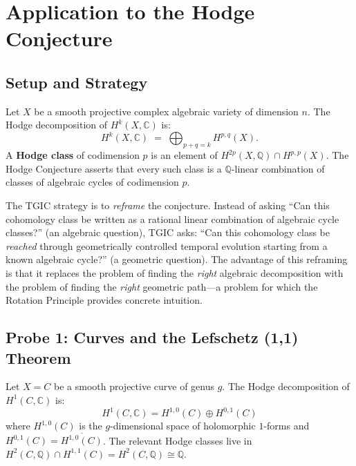 \documentclass[11pt,a4paper]{article}
\theoremstyle{definition}
\theoremstyle{plain}
\newcommand{\QQ}{\mathbb{Q}}
\newcommand{\CC}{\mathbb{C}}
\begin{document}
\section{Application to the Hodge Conjecture}\label{sec:application}

\subsection{Setup and Strategy}

Let $X$ be a smooth projective complex algebraic variety of dimension $n$. The Hodge decomposition of $H^{k}(X, \CC)$ is:
\begin{equation}\label{eq:hodge-decomp}
H^{k}(X, \CC) \;=\; \bigoplus_{p+q=k} H^{p,q}(X).
\end{equation}
A \textbf{Hodge class} of codimension $p$ is an element of $H^{2p}(X, \QQ) \cap H^{p,p}(X)$. The Hodge Conjecture asserts that every such class is a $\QQ$-linear combination of classes of algebraic cycles of codimension $p$.

The TGIC strategy is to \emph{reframe} the conjecture. Instead of asking ``Can this cohomology class be written as a rational linear combination of algebraic cycle classes?'' (an algebraic question), TGIC asks: ``Can this cohomology class be \emph{reached} through geometrically controlled temporal evolution starting from a known algebraic cycle?'' (a geometric question). The advantage of this reframing is that it replaces the problem of finding the \emph{right} algebraic decomposition with the problem of finding the \emph{right} geometric path---a problem for which the Rotation Principle provides concrete intuition.

\subsection{Probe 1: Curves and the Lefschetz (1,1) Theorem}

Let $X = C$ be a smooth projective curve of genus $g$. The Hodge decomposition of $H^1(C, \CC)$ is:
\begin{equation}\label{eq:curve-hodge}
H^1(C, \CC) = H^{1,0}(C) \oplus H^{0,1}(C)
\end{equation}
where $H^{1,0}(C)$ is the $g$-dimensional space of holomorphic $1$-forms and $H^{0,1}(C) = \overline{H^{1,0}(C)}$. The relevant Hodge classes live in $H^2(C, \QQ) \cap H^{1,1}(C) = H^2(C, \QQ) \cong \QQ$.
\end{document}
